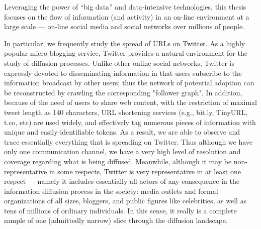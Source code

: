 \documentclass[phd,tocprelim]{cornell}
\begin{document}



Leveraging the power of ``big data'' and data-intensive technologies, this thesis focuses on the flow of information (and activity) in an on-line environment at a large scale --- on-line social media and social networks over millions of people. 

In particular, we frequently study the spread of URLs on Twitter. As a highly popular micro-blogging service, Twitter provides a natural environment for the study of diffusion processes. Unlike other online social networks, Twitter is expressly devoted to disseminating information in that users subscribe to the information broadcast by other users; thus the network of potential adoption can be reconstructed by crawling the corresponding "follower graph". In addition, because of the need of users to share web content, with the restriction of maximal tweet length as 140 characters, URL shortening services (e.g., bit.ly, TinyURL, t.co, etc) are used widely, and effectively tag numerous pieces of information with unique and easily-identifiable tokens. As a result, we are able to observe and trace essentially everything that is spreading on Twitter. Thus although we have only one communication channel, we have a very high level of resolution and coverage regarding what is being diffused. Meanwhile, although it may be non-representative in some respects, Twitter is very representative in at least one respect --- namely it includes essentially all actors of any consequence in the information diffusion process in the society: media outlets and formal organizations of all sizes, bloggers, and public figures like celebrities, as well as tens of millions of ordinary individuals. In this sense, it really is a complete sample of one (admittedly narrow) slice through the diffusion landscape. 
\end{document}
